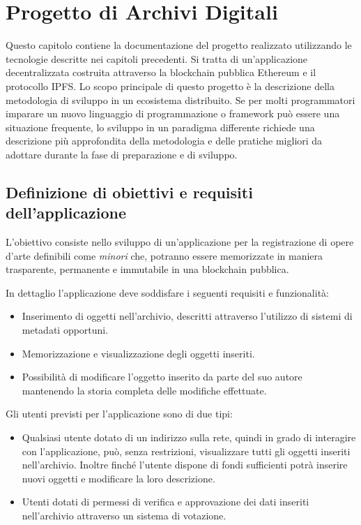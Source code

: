 \chapter{Progetto di Archivi Digitali}
\label{ch:archivi}

Questo capitolo contiene la documentazione del progetto realizzato utilizzando le tecnologie descritte nei capitoli precedenti. Si tratta di un’applicazione decentralizzata costruita attraverso la blockchain pubblica Ethereum e il protocollo IPFS. Lo scopo principale di questo progetto è la descrizione della metodologia di sviluppo in un ecosistema distribuito. Se per molti programmatori imparare un nuovo linguaggio di programmazione o framework può essere una situazione frequente, lo sviluppo in un paradigma differente richiede una descrizione più approfondita della metodologia e delle pratiche migliori da adottare durante la fase di preparazione e di sviluppo.

\section{Definizione di obiettivi e requisiti dell’applicazione}

L’obiettivo consiste nello sviluppo di un'applicazione per la registrazione di opere d’arte definibili come \emph{minori} che, potranno essere memorizzate in maniera trasparente, permanente e immutabile in una blockchain pubblica.

In dettaglio l’applicazione deve soddisfare i seguenti requisiti e funzionalità:

\begin{itemize}
\item Inserimento di oggetti nell’archivio, descritti attraverso l’utilizzo di sistemi di metadati opportuni.
\item Memorizzazione e visualizzazione degli oggetti inseriti.
\item Possibilità di modificare l’oggetto inserito da parte del suo autore mantenendo la storia completa delle modifiche effettuate.
\end{itemize}

Gli utenti previsti per l'applicazione sono di due tipi:
\begin{itemize}
\item Qualsiasi utente dotato di un indirizzo sulla rete, quindi in grado di interagire con l'applicazione, può, senza restrizioni, visualizzare tutti gli oggetti inseriti nell'archivio. Inoltre finché l'utente dispone di fondi sufficienti potrà inserire nuovi oggetti e modificare la loro descrizione.
\item Utenti dotati di permessi di verifica e approvazione dei dati inseriti nell'archivio attraverso un sistema di votazione.
\end{itemize}

